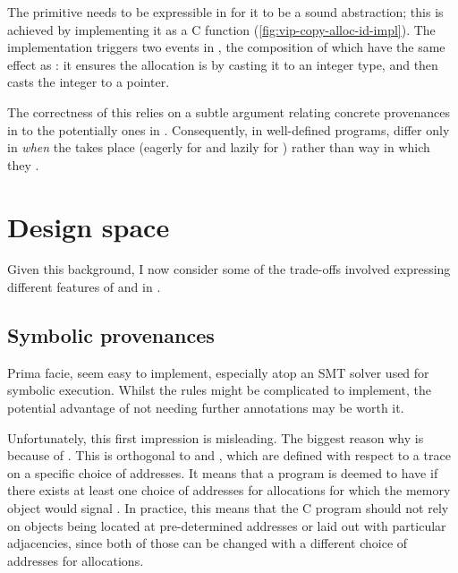The   primitive needs to be expressible in
 for it to be a sound abstraction; this is achieved by
implementing it as a C function (\cref{fig:vip-copy-alloc-id-impl}). The
implementation triggers two events in , the composition of
which have the same effect as : it ensures the
allocation is  by casting it to an integer type, and then casts the
integer to a pointer.

The correctness of this relies on a subtle argument relating concrete
provenances in  to the potentially  ones in
. Consequently, in well-defined programs, 
differ only in \emph{when} the  takes place (eagerly for
 and lazily for ) rather than way in which they
.

\begin{marginfigure}
    \caption{Implementation of   primitive in C, to
        work above existing compilers, modelled via
        .}\label{fig:vip-copy-alloc-id-impl}
\end{marginfigure}


\section{Design space}

Given this background, I now consider some of the trade-offs involved
expressing different features of  and  in .

\subsection{Symbolic provenances}

Prima facie,  seem easy to implement, especially atop
an SMT solver used for symbolic execution. Whilst the rules might be
complicated to implement, the potential advantage of not needing further
annotations may be worth it.

Unfortunately, this first impression is misleading. The biggest reason why is
because of . This is
orthogonal to  and , which are defined with respect to
a trace on a specific choice of addresses. It means that a program is deemed to
have  if there exists at least one choice of addresses for allocations
for which the memory object would signal . In practice, this means that
the C program should not rely on objects being located at pre-determined
addresses or laid out with particular adjacencies, since both of those can be
changed with a different choice of addresses for allocations.

